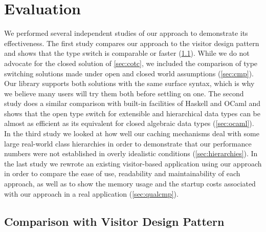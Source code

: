 \section{Evaluation} %
\label{sec:eval}

We performed several independent studies of our approach to demonstrate its 
effectiveness. The first study compares our approach to the visitor design 
pattern and shows that the type switch is comparable or faster 
(\textsection\ref{sec:viscmp}). While we do not advocate for the closed solution 
of \textsection\ref{sec:cotc}, we included the comparison of type switching 
solutions made under open and closed world assumptions (\textsection\ref{sec:cmp}).
Our library supports both solutions with the same surface syntax, which is why 
we believe many users will try them both before settling on one.
The second study does a similar comparison with built-in facilities of Haskell 
and OCaml and shows that the open type switch for extensible and hierarchical 
data types can be almost as efficient as its equivalent for closed algebraic 
data types (\textsection\ref{sec:ocaml}). In the third study we looked at how 
well our caching mechanisms deal with some large real-world class hierarchies in 
order to demonstrate that our performance numbers were not established in overly 
idealistic conditions (\textsection\ref{sec:hierarchies}). In the last study we 
rewrote an existing visitor-based application using our approach in order to 
compare the ease of use, readability and maintainability of each approach, as 
well as to show the memory usage and the startup costs associated with our 
approach in a real application (\textsection\ref{sec:qualcmp}).

\subsection{Comparison with Visitor Design Pattern}
\label{sec:viscmp}


